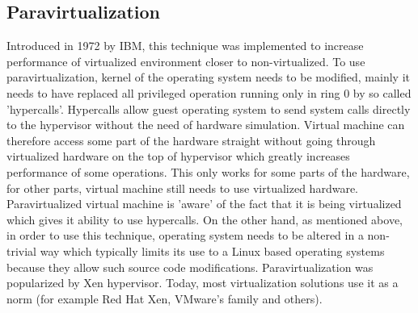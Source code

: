 \subsection{Paravirtualization} 
\label{paravirtualization}
Introduced in 1972 by IBM, this technique was implemented to increase performance of virtualized environment closer to non-virtualized. To use paravirtualization, kernel of the operating system needs to be modified, mainly it needs to have replaced all privileged operation running only in ring 0 by so called 'hypercalls'. Hypercalls allow guest operating system to send system calls directly to the hypervisor without the need of hardware simulation. Virtual machine can therefore access some part of the hardware straight without going through virtualized hardware on the top of hypervisor which greatly increases performance of some operations. This only works for some parts of the hardware, for other parts, virtual machine still needs to use virtualized hardware. Paravirtualized virtual machine is 'aware' of the fact that it is being virtualized which gives it ability to use hypercalls. On the other hand, as mentioned above, in order to use this technique, operating system needs to be altered in a non-trivial way which typically limits its use to a Linux based operating systems because they allow such source code modifications.
Paravirtualization was popularized by Xen hypervisor. Today, most virtualization solutions use it as a norm (for example Red Hat Xen, VMware's family and others).

